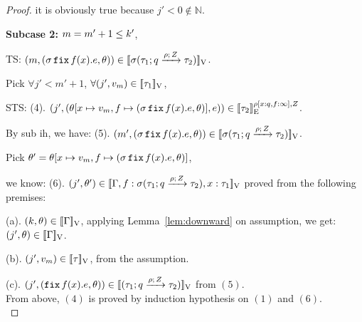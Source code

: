 \documentclass[a4paper,11pt]{article}
\theoremstyle{definition}
\begin{document}
\begin{proof}
	it is obviously true because $j' < 0 \notin \mathbb{N}$.

{\bf Subcase 2:} $m = m' + 1 \leq \stepiA'$, 

	TS: $ (m, (\ienv \efix f(x). \expr, \env)) \in \lrv{\ienv (\tarr{\type_1}{\type_2}{\nnatbiA}{\dmap}{\nnatA})}$.

	Pick $\forall j' < m' + 1$, $\forall (j', \valr_m) \in \lrv{\type_1}$,
	
	STS: (4). $(j', (\env[x \mapsto \valr_m, f \mapsto (\ienv \efix f(x).\expr, \env)], \expr)) \in \lre{\dmap[x: \nnatbiA, f: \infty]}{\nnatA}{\type_2} $.
	
	By sub ih, we have:
	(5). $(m', (\ienv \efix f(x). \expr, \env)) \in \lrv{\ienv (\tarr{\type_1}{\type_2}{\nnatbiA}{\dmap}{\nnatA})}$.

	Pick $\env' = \env[x \mapsto \valr_m, f \mapsto (\ienv \efix f(x).\expr, \env)]$,
	
	we know: (6). $(j', \env') \in \lrv{\Gamma,
          f:\ienv (\tarr{\type_1}{\type_2}{\nnatbiA}{\dmap}{\nnatA}),  x:
          \type_1}$ proved from the following premises:
	
	(a). $ (\stepiA, \env) \in \lrv{\Gamma}$, applying Lemma~\ref{lem:downward} on assumption, we get: $(j', \env) \in \lrv{\Gamma}$.
	
	(b). $(j', \valr_m) \in \lrv{\type}$, from the assumption.
	
	(c). $(j', (\efix f(x). \expr, \env)) \in \lrv{(\tarr{\type_1}{\type_2}{\nnatbiA}{\dmap}{\nnatA})}$ from $(5)$.\\
%
From above, $(4)$ is proved by induction hypothesis on $(1)$ and $(6)$.\\
%



\end{proof}
\end{document}
